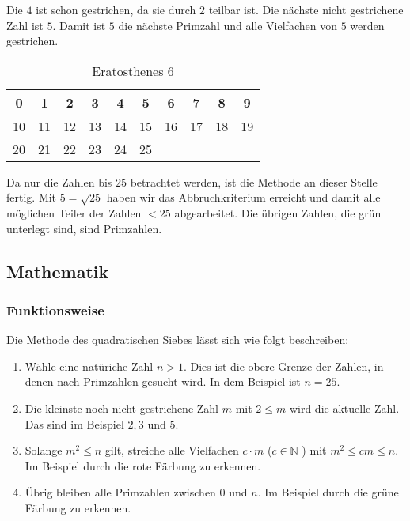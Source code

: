 	Die $4$ ist schon gestrichen, da sie durch $2$ teilbar ist. Die n\"achste nicht gestrichene Zahl ist $5$. Damit ist $5$ die n\"achste Primzahl und alle Vielfachen von $5$ werden gestrichen.
	
	\begin{table}[!ht] 
		\centering
		\begin{tabular}{|c|c|c|c|c|c|c|c|c|c|}
			\hline	 		 			
			\cellcolor{red}0  & \cellcolor{red} 1 &  \cellcolor{green}2 &  \cellcolor{green}3 & \cellcolor{red}4 &  \cellcolor{green}5 & \cellcolor{red} 6 &  \cellcolor{green}7 & \cellcolor{red} 8 &  \cellcolor{red}9 \\
			\hline
			\cellcolor{red}10 & \cellcolor{green}11 & \cellcolor{red}12 & \cellcolor{green}13 & \cellcolor{red}14 & \cellcolor{red}15 & \cellcolor{red}16 & \cellcolor{green}17 & \cellcolor{red}18 & \cellcolor{green}19 \\
			\hline
			\cellcolor{red}20 & \cellcolor{red}21 & \cellcolor{red}22 & \cellcolor{green}23 & \cellcolor{red}24 & \cellcolor{red}25 &  &  &  &  \\
			\hline
		\end{tabular}
		\caption{Eratosthenes 6}
		\label{tab:eratosthenes6}			
	\end{table}
	
	Da nur die Zahlen bis $25$ betrachtet werden, ist die Methode an dieser Stelle fertig. Mit $5=\sqrt{25}$ haben wir das Abbruchkriterium erreicht und damit alle m\"oglichen Teiler der Zahlen $<25$ abgearbeitet. Die \"ubrigen Zahlen, die gr\"un unterlegt sind, sind Primzahlen. 
	
	\subsection{Mathematik}
	\subsubsection{Funktionsweise}
	Die Methode des quadratischen Siebes l\"asst sich wie folgt beschreiben:
	\begin{enumerate}
		
		\item W\"ahle eine nat\"uriche Zahl $n > 1$. Dies ist die obere Grenze der Zahlen, in denen nach Primzahlen gesucht wird. In dem Beispiel ist $n=25$.
		\item Die kleinste noch nicht gestrichene Zahl $m$ mit $2 \leq m$ wird die aktuelle Zahl. Das sind im Beispiel $2,3$ und $5$.
		\item Solange $m^2 \leq n$ gilt, streiche alle Vielfachen $c\cdot m$ ($c \in \mathbb{N} $ ) mit $m^2 \leq cm \leq n$. Im Beispiel durch die rote F\"arbung zu erkennen.
		\item \"Ubrig bleiben alle Primzahlen zwischen $0$ und $n$. Im Beispiel durch die gr\"une F\"arbung zu erkennen.
	\end{enumerate}
	
